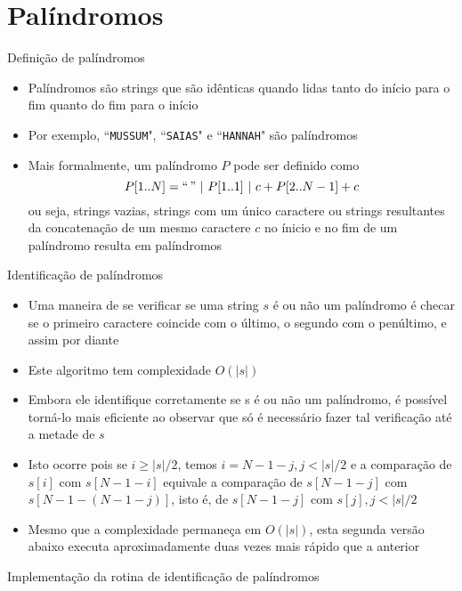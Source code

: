 \section{Palíndromos}

\begin{frame}[fragile]{Definição de palíndromos}

    \begin{itemize}
        \item Palíndromos são strings que são idênticas quando lidas tanto do início para o fim 
            quanto do fim para o início

        \item Por exemplo, ``\texttt{MUSSUM}", ``\texttt{SAIAS}" e ``\texttt{HANNAH}" são palíndromos

        \item Mais formalmente, um palíndromo $P$ pode ser definido como
        \[
            P[1..N] = ``\,"\ \vert\ P[1..1]\ \vert\ c + P[2..N-1] + c
        \]
        ou seja, strings vazias, strings com um único caractere ou strings resultantes da concatenação de um mesmo caractere $c$ no ínicio e no fim de um palíndromo resulta em palíndromos


    \end{itemize}

\end{frame}

\begin{frame}[fragile]{Identificação de palíndromos}

    \begin{itemize}
        \item Uma maneira de se verificar se uma string $s$ é ou não um palíndromo é checar se o 
            primeiro caractere coincide com o último, o segundo com o penúltimo, e assim por diante

        \item Este algoritmo tem complexidade $O(|s|)$

        \item Embora ele identifique corretamente se s é ou não um palíndromo, é possível torná-lo 
            mais eficiente ao observar que só é necessário fazer tal verificação até a metade de $s$

        \item Isto ocorre pois se $i \geq |s|/2$, temos $i = N - 1 - j, j < |s|/2$ e a comparação 
            de $s[i]$ com $s[N - 1 - i]$ equivale a comparação de $s[N - 1 - j]$ com 
            $s[N - 1 - (N - 1 - j)]$, isto é, de $s[N - 1 - j]$ com $s[j], j < |s|/2$

        \item Mesmo que a complexidade permaneça em $O(|s|)$, esta segunda versão abaixo executa 
            aproximadamente duas vezes mais rápido que a anterior
    \end{itemize}

\end{frame}

\begin{frame}[fragile]{Implementação da rotina de identificação de palíndromos}
\end{frame}
